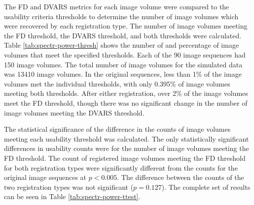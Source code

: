 The FD and DVARS metrics for each image volume were compared to the usability criteria thresholds to determine the number of image volumes which were recovered by each registration type. The number of image volumes meeting the FD threshold, the DVARS threshold, and both thresholds were calculated. Table \ref{tab:spectr-power-thresh} shows the number of and percentage of image volumes that meet the specified thresholds. Each of the 90 image sequences had 150 image volumes. The total number of image volumes for the simulated data was 13410 image volumes. In the original sequences, less than 1\% of the image volumes met the individual thresholds, with only 0.395\% of image volumes meeting both thresholds. After either registration, over 2\% of the image volumes meet the FD threshold, though there was no significant change in the number of image volumes meeting the DVARS threshold.

The statistical significance of the difference in the counts of image volumes meeting each usability threshold was calculated. The only statistically significant differences in usability counts were for the number of image volumes meeting the FD threshold. The count of registered image volumes meeting the FD threshold for both registration types were significantly different from the counts for the original image sequences at $p < 0.005$. The difference between the counts of the two registration types was not significant ($p = 0.127$). The complete set of results can be seen in Table \ref{tab:spectr-power-ttest}. 

